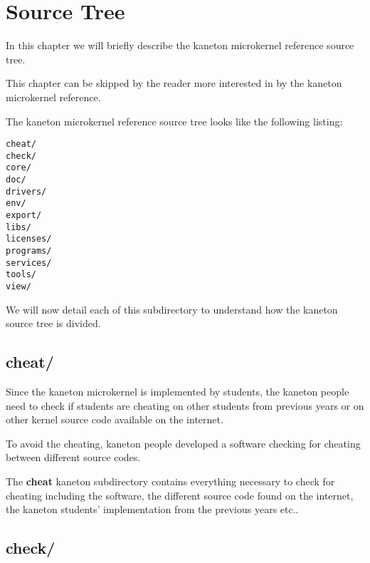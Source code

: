 
%
%

\chapter{Source Tree}

In this chapter we will briefly describe the kaneton microkernel reference
source tree.

This chapter can be skipped by the reader more interested in by the
kaneton microkernel reference.

\newpage

%
%

The kaneton microkernel reference source tree looks like the following
listing:

\begin{verbatim}
cheat/
check/
core/
doc/
drivers/
env/
export/
libs/
licenses/
programs/
services/
tools/
view/
\end{verbatim}

We will now detail each of this subdirectory to understand how the
kaneton source tree is divided.

%
%

\section{cheat/}

Since the kaneton microkernel is implemented by students, the kaneton
people need to check if students are cheating on other students from
previous years or on other kernel source code available on the internet.

To avoid the cheating, kaneton people developed a software checking
for cheating between different source codes.

The \textbf{cheat} kaneton subdirectory contains everything necessary
to check for cheating including the software, the different source code
found on the internet, the kaneton students' implementation from the
previous years etc..

%
%

\section{check/}

